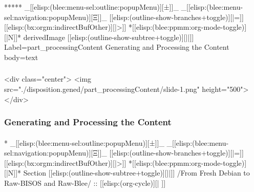\begin{whenOrg}
\begin{whenOrg}
*****  _[[elisp:(blee:menu-sel:outline:popupMenu)][±]]_ _[[elisp:(blee:menu-sel:navigation:popupMenu)][Ξ]]_ [[elisp:(outline-show-branches+toggle)][|=]] [[elisp:(bx:orgm:indirectBufOther)][|>]] *[[elisp:(blee:ppmm:org-mode-toggle)][|N]]*  derivedImage [[elisp:(outline-show-subtree+toggle)][||]] Label=part_processingContent Generating and Processing the Content body=text
\end{whenOrg}

\begin{htmlonly}

\begin{frame}[fragile,plain,label=part_processingContent]
    \frametitle{}
    \framesubtitle{}
    \begin{rawhtml}
<div class="center">
<img src="./disposition.gened/part_processingContent/slide-1.png" height="500">
</div>
    \end{rawhtml}
\end{frame}
\end{htmlonly}

\begin{verblatex}

\begin{frame}[fragile,label=part_processingContent]
    \frametitle{Generating and Processing the Content}
    \framesubtitle{}

    \tableofcontents

\end{frame}
\end{verblatex}


\begin{whenOrg}
*  _[[elisp:(blee:menu-sel:outline:popupMenu)][±]]_ _[[elisp:(blee:menu-sel:navigation:popupMenu)][Ξ]]_ [[elisp:(outline-show-branches+toggle)][|=]] [[elisp:(bx:orgm:indirectBufOther)][|>]] *[[elisp:(blee:ppmm:org-mode-toggle)][|N]]*  Section    [[elisp:(outline-show-subtree+toggle)][||]]   /From Fresh Debian to Raw-BISOS and Raw-Blee/ ::  [[elisp:(org-cycle)][| ]]
\end{whenOrg}


\end{whenOrg}
